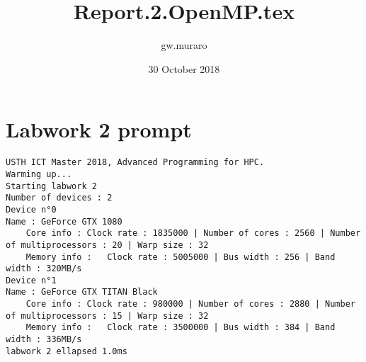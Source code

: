 \documentclass{article}
\title{Report.2.OpenMP.tex}
\author{gw.muraro }
\date{30 October 2018}
\begin{document}
\maketitle

\section{Labwork 2 prompt}

\begin{verbatim}
USTH ICT Master 2018, Advanced Programming for HPC.
Warming up...
Starting labwork 2
Number of devices : 2
Device n°0
Name : GeForce GTX 1080
	Core info : Clock rate : 1835000 | Number of cores : 2560 | Number of multiprocessors : 20 | Warp size : 32
	Memory info : 	Clock rate : 5005000 | Bus width : 256 | Band width : 320MB/s
Device n°1
Name : GeForce GTX TITAN Black
	Core info : Clock rate : 980000 | Number of cores : 2880 | Number of multiprocessors : 15 | Warp size : 32
	Memory info : 	Clock rate : 3500000 | Bus width : 384 | Band width : 336MB/s
labwork 2 ellapsed 1.0ms

\end{verbatim}
\end{document}

